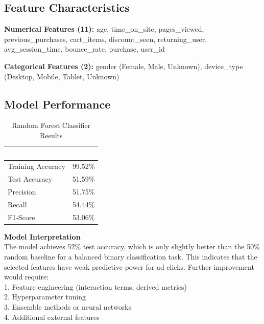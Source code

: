 \documentclass[11pt,a4paper]{article}
\begin{document}
\subsection{Feature Characteristics}

\textbf{Numerical Features (11):}
age, time\_on\_site, pages\_viewed, previous\_purchases, cart\_items, discount\_seen,
returning\_user, avg\_session\_time, bounce\_rate, purchase, user\_id

\textbf{Categorical Features (2):}
gender (Female, Male, Unknown), device\_type (Desktop, Mobile, Tablet, Unknown)

\subsection{Model Performance}

\begin{table}[H]
\centering
\caption{Random Forest Classifier Results}
\small
\begin{tabular}{L{3.5cm} C{2.5cm}}
\toprule
{}
\textcolor{white}{\textbf{Metric}} &
\textcolor{white}{\textbf{Score}} \\
\midrule
Training Accuracy & 99.52\% \\
Test Accuracy & 51.59\% \\
Precision & 51.75\% \\
Recall & 54.44\% \\
F1-Score & 53.06\% \\
\bottomrule
\end{tabular}
\end{table}

\begin{mlbox}
\textbf{\color{black} Model Interpretation}\\
The model achieves 52\% test accuracy, which is only slightly better than the 50\% random
baseline for a balanced binary classification task. This indicates that the selected features
have weak predictive power for ad clicks. Further improvement would require:\\
\vspace{6pt}
1. Feature engineering (interaction terms, derived metrics)\\
2. Hyperparameter tuning\\
3. Ensemble methods or neural networks\\
4. Additional external features
\end{mlbox}

\end{document}
